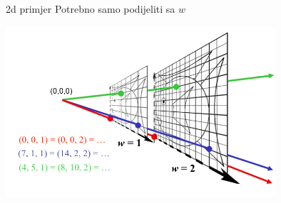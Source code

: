 \documentclass[9pt]{beamer}
\begin{document}
\begin{frame}{2d primjer}
	Potrebno samo podijeliti sa $w$
	\begin{center}
		\includegraphics[width=10cm]{slike/homogenekoo_2d.png}
	\end{center}
\end{frame}
\end{document}
